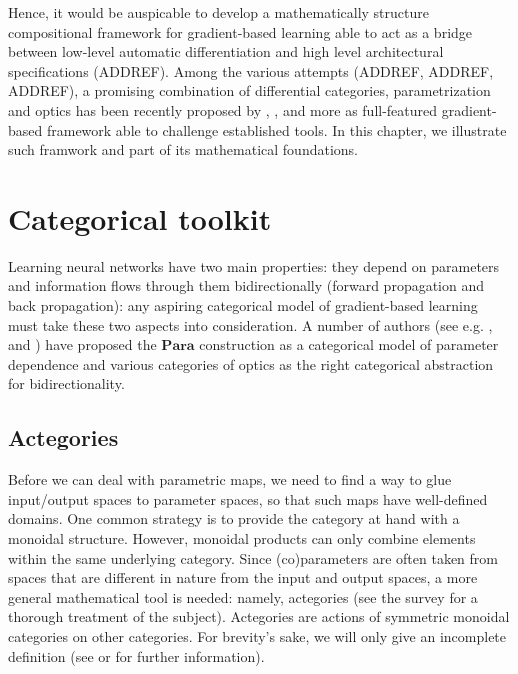 \documentclass[11pt,a4paper,openright,twoside]{report}
\theoremstyle{plain}
\theoremstyle{definition}
\begin{document}
Hence, it would be auspicable to develop a mathematically structure compositional framework for gradient-based learning able to act as a bridge between low-level automatic differentiation and high level architectural specifications (ADDREF). Among the various attempts (ADDREF, ADDREF, ADDREF), a promising combination of differential categories, parametrization and optics has been recently proposed by \cite{cockett2019reverse}, \cite{cruttwell2022categorical}, \cite{gavranovic2024fundamental} and more as full-featured gradient-based framework able to challenge established tools. In this chapter, we illustrate such framwork  and part of its mathematical foundations. 



\section{Categorical toolkit}

Learning neural networks have two main properties: they depend on parameters and information flows through them bidirectionally (forward propagation and back propagation): any aspiring categorical model of gradient-based learning must take these two aspects into consideration. A number of authors (see e.g. \cite{gavranovic2024fundamental}, and \cite{cruttwell2022categorical}) have proposed the $\mathbf{Para}$ construction as a categorical model of parameter dependence and various categories of optics as the right categorical abstraction for bidirectionality.

\subsection{Actegories}

Before we can deal with parametric maps, we need to find a way to glue input/output spaces to parameter spaces, so that such maps have well-defined domains. One common strategy is to provide the category at hand with a monoidal structure. However, monoidal products can only combine elements within the same underlying category. Since (co)parameters are often taken from spaces that are different in nature from the input and output spaces, a more general mathematical tool is needed: namely, actegories (see the survey \cite{capucci2022actegories} for a thorough treatment of the subject).  Actegories are actions of symmetric monoidal categories on other categories. For brevity's sake, we will only give an incomplete definition (see \cite{capucci2022actegories} or \cite{gavranovic2024fundamental} for further information).
\end{document}
